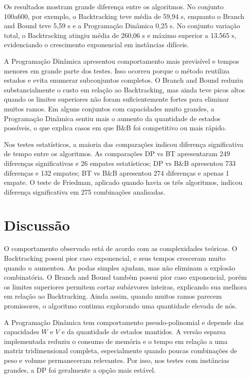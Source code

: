 \documentclass[
    12pt,
    oneside,
    a4paper,
    brazil,
    article
]{abntex2}
\begin{document}
Os resultados mostram grande diferença entre os algoritmos. No conjunto 100a600, por exemplo, o Backtracking teve média de 59,94 s, enquanto o Branch and Bound teve 5,59 s e a Programação Dinâmica 0,25 s. No conjunto variação total, o Backtracking atingiu média de 260,06 s e máximo superior a 13.565 s, evidenciando o crescimento exponencial em instâncias difíceis.

A Programação Dinâmica apresentou comportamento mais previsível e tempos menores em grande parte dos testes. Isso ocorreu porque o método reutiliza estados e evita enumerar subconjuntos completos. O Branch and Bound reduziu substancialmente o custo em relação ao Backtracking, mas ainda teve picos altos quando os limites superiores não foram suficientemente fortes para eliminar muitos ramos. Em alguns conjuntos com capacidades muito grandes, a Programação Dinâmica sentiu mais o aumento da quantidade de estados possíveis, o que explica casos em que B\&B foi competitivo ou mais rápido.

Nos testes estatísticos, a maioria das comparações indicou diferença significativa de tempo entre os algoritmos. As comparações DP vs BT apresentaram 249 diferenças significativas e 26 empates estatísticos; DP vs B\&B apresentou 733 diferenças e 132 empates; BT vs B\&B apresentou 274 diferenças e apenas 1 empate. O teste de Friedman, aplicado quando havia os três algoritmos, indicou diferença significativa em 275 combinações analisadas.

\section{Discussão}

O comportamento observado está de acordo com as complexidades teóricas. O Backtracking possui pior caso exponencial, e seus tempos cresceram muito quando $n$ aumentou. As podas simples ajudam, mas não eliminam a explosão combinatória. O Branch and Bound também possui pior caso exponencial, porém os limites superiores permitem cortar subárvores inteiras, explicando sua melhora em relação ao Backtracking. Ainda assim, quando muitos ramos parecem promissores, o algoritmo continua explorando uma quantidade elevada de nós.

A Programação Dinâmica tem comportamento pseudo-polinomial e depende das capacidades $W$ e $V$ e da quantidade de estados mantidos. A versão esparsa implementada reduziu o consumo de memória e o tempo em relação a uma matriz tridimensional completa, especialmente quando poucas combinações de peso e volume permaneceram relevantes. Por isso, nos testes com instâncias grandes, a DP foi geralmente a opção mais estável.
\end{document}
